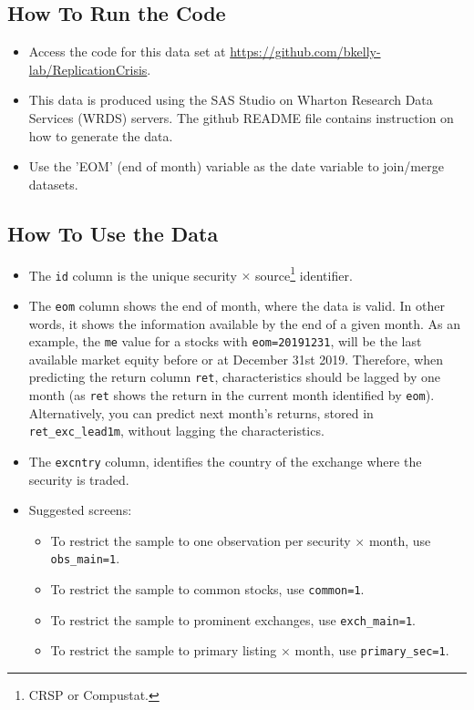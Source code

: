 \documentclass[12pt,title,fleqn]{article}
\begin{document}
\subsection{How To Run the Code}
    \begin{itemize}
    \item Access the code for this data set at \url{https://github.com/bkelly-lab/ReplicationCrisis}.
    \item This data is produced using the SAS Studio on Wharton Research Data Services (WRDS) servers. The github README file contains instruction on how to generate the data.
    \item Use the 'EOM' (end of month) variable as the date variable to join/merge datasets.
\end{itemize}

\subsection{How To Use the Data}
\begin{itemize}
	\item The \texttt{id} column is the unique security $\times$ source\footnote{CRSP or Compustat.} identifier.
	\item The \texttt{eom} column shows the end of month, where the data is valid. In other words, it shows the information available by the end of a given month. As an example, the \texttt{me} value for a stocks with \texttt{eom=20191231}, will be the last available market equity before or at December 31st 2019. Therefore, when predicting the return column \texttt{ret}, characteristics should be lagged by one month (as \texttt{ret} shows the return in the current month identified by \texttt{eom}). Alternatively, you can predict next month’s returns, stored in \texttt{ret\_exc\_lead1m}, without lagging the characteristics.
	\item The \texttt{excntry} column, identifies the country of the exchange where the security is traded.
	\item Suggested screens:
	\begin{itemize}
		\item To restrict the sample to one observation per security $\times$ month, use \texttt{obs\_main=1}.
		\item To restrict the sample to common stocks, use \texttt{common=1}.
		\item To restrict the sample to prominent exchanges, use \texttt{exch\_main=1}.
		\item To restrict the sample to primary listing $\times$ month, use \texttt{primary\_sec=1}.
	\end{itemize}  
	
\end{itemize}
\end{document}

